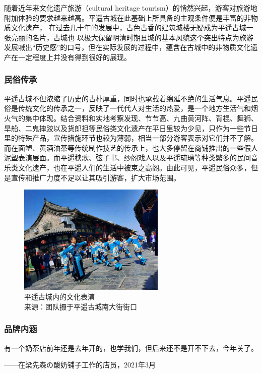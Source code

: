 \documentclass[UTF8]{ctexart}
\begin{document}
    随着近年来文化遗产旅游（cultural heritage tourism）的悄然兴起，游客对旅游地附加体验的要求越来越高。平遥古城在此基础上所具备的主观条件便是丰富的非物质文化遗产， 在过去几十年的发展中，古色古香的建筑城楼无疑成为平遥古城一张亮丽的名片，古城也 以极大保留明清时期县城的基本风貌这个突出特点为旅游发展喊出“历史感”的口号，但在实际发展的过程中，蕴含在古城中的非物质文化遗产在一定程度上并没有得到很好的展现。        \subsubsection{民俗传承}
        平遥古城不但浓缩了历史的古朴厚重，同时也承载着绵延不绝的生活气息。平遥民俗是传统文化的传承之一，反映了一代代人对生活的热爱，是一个地方生活气和烟火气的集中体现。结合资料和实地考察发现、节节高、九曲黄河阵、背棍、舞狮、旱船、二鬼摔跤以及货郎担等民俗类文化遗产在平日里较为少见，只作为一些节日里的特殊产品，宣传措施环节也较为薄弱，相当一部分游客表示对它们并不了解。而在面塑、黄酒油茶等传统制作技艺的传承上，也大多停留在商铺推出的一些假人泥塑表演层面。而平遥秧歌、弦子书、纱阁戏人以及平遥琉璃等种类繁多的民间音乐类文化遗产，也在平遥人们的生活中被束之高阁。由此可见，平遥民俗众多，但是宣传和推广力度不足以让其吸引游客，扩大市场范围。      
        \begin{figure}[H]
            \centering
            \includegraphics[width=7cm]{表演.jpg}
            \caption[plain]{平遥古城内的文化表演\\来源：团队摄于平遥古城南大街街口}
    
        \end{figure}
        \subsubsection{品牌内涵}
        有一个奶茶店前年还是去年开的，也学我们，但后来还不是开不下去，今年关了。
        
        \begin{flushright}
            ——在梁先森の酸奶铺子工作的店员，2021年3月
        \end{flushright}   
        
\end{document}
